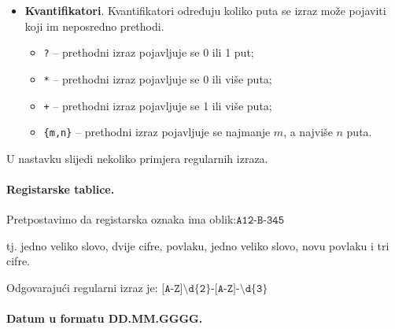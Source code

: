 \begin{itemize}
\begin{itemize}
		\item \texttt{\textbackslash n} -- odgovara znaku novog reda;
		
		\item \texttt{\textbackslash t} -- odgovara tabulatoru;
		
		\item \texttt{\textbackslash b} -- odgovara granici riječi.
		
	\end{itemize}
	
	\item \textbf{Kvantifikatori}. Kvantifikatori određuju koliko puta se izraz  može pojaviti  koji im neposredno prethodi.
	
	\begin{itemize}
		
		\item \texttt{?} -- prethodni izraz pojavljuje se 0 ili 1 put;
		
		\item \texttt{*} -- prethodni izraz pojavljuje se 0 ili više puta;
		
		\item \texttt{+} -- prethodni izraz pojavljuje se 1 ili više puta;
		
		\item \texttt{\{m,n\}} -- prethodni izraz pojavljuje se najmanje $m$, a najviše $n$ puta.
		
	\end{itemize}
	
\end{itemize}

U nastavku slijedi nekoliko primjera regularnih izraza.
 

\paragraph{Registarske tablice.}

Pretpostavimo da registarska oznaka ima oblik:$
\texttt{A12-B-345}$

tj. jedno veliko slovo, dvije cifre, povlaku, jedno veliko slovo, novu povlaku i tri cifre.

Odgovarajući regularni izraz je: $
\texttt{[A-Z]\textbackslash d\{2\}-[A-Z]-\textbackslash d\{3\}}$

\paragraph{Datum u formatu DD.MM.GGGG.}

